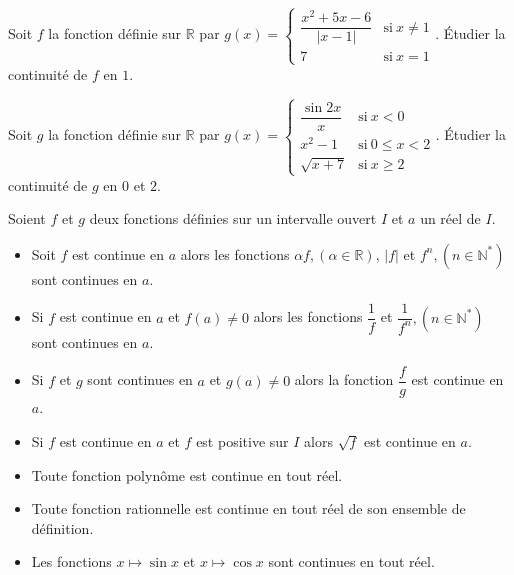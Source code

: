 \documentclass[12pt,a4paper,x11names,usenames,dvipsnames,svgnames,oneside]{book}
\def\N{\mathbb{N}}
\def\R{\mathbb{R}}
\begin{document}
\begin{act}
Soit $f$ la fonction définie sur $\R$ par $g(x)=\left\lbrace \begin{array}{ll}
\dfrac{x^2+5x-6}{\left|x-1\right|}&\text{si}~x\neq 1\\
7&\text{si}~x=1

\end{array} \right. $.
\'{E}tudier la continuité de $f$ en $1$.
\end{act}

\begin{act}
Soit $g$ la fonction définie sur $\R$ par $g(x)=\left\lbrace \begin{array}{ll}
\dfrac{\sin 2x}{x}&\text{si}~x<0\\
x^2-1&\text{si}~ 0\leqslant x <2\\
\sqrt{x+7}&\text{si}~x \geqslant 2

\end{array} \right. $. 
\'{E}tudier la continuité de $g$ en $0$ et $2$.
\end{act}
\begin{thr}
Soient $f$ et $g$ deux fonctions définies sur un intervalle ouvert $I$ et $a$ un réel de $I$.
\begin{itemize}
\item Soit $f$ est continue en $a$ alors les fonctions $\alpha f,(\alpha\in\R)$, $\left|f\right|$ et $f^n, (n\in\N^*)$ sont continues en $a$.
\item Si $f$ est continue en $a$ et $f(a)\neq 0$ alors les fonctions $\dfrac{1}{f}$ et $\dfrac{1}{f^n}, (n\in\N^*)$ sont continues en $a$.
\item Si $f$ et $g$ sont continues en $a$ et $g(a)\neq 0$ alors la fonction $\dfrac{f}{g}$ est continue en $a$.
\item Si $f$ est continue en $a$ et $f$ est positive sur $I$ alors $\sqrt{f}$ est continue en $a$.
\end{itemize}
\end{thr}
\begin{thr}
\begin{itemize}
\item Toute fonction polynôme est continue en tout réel.
\item Toute fonction rationnelle est continue en tout réel de son ensemble de définition.
\item Les fonctions $x\longmapsto \sin x$ et $x\longmapsto \cos x$ sont continues en tout réel.
\end{itemize}
\end{thr}
\end{document}
